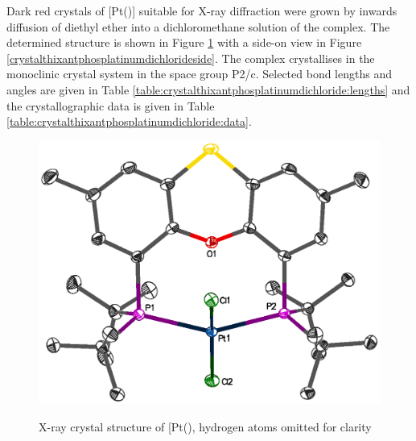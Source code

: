 Dark red crystals of [Pt(\tButhixantphos)] suitable for X-ray diffraction were grown by inwards diffusion of diethyl ether into a dichloromethane solution of the complex.  The determined structure is shown in Figure \ref{crystalthixantphosplatinumdichloride} with a side-on view in Figure \ref{crystalthixantphosplatinumdichlorideside}.  The complex crystallises in the monoclinic crystal system in the space group P2/c.  Selected bond lengths and angles are given in Table \ref{table:crystalthixantphosplatinumdichloride:lengths} and the crystallographic data is given in Table \ref{table:crystalthixantphosplatinumdichloride:data}.  

\begin{figure}[htbp]
\begin{center}
\vspace{0.5cm}
\includegraphics[scale=0.8]{../Figures/Crystalthixantphosplatinumdichloride.eps}
\caption[X-ray crystal structure of \ce{[Pt(\tButhixantphos)Cl2]}]{X-ray crystal structure of [Pt(\tButhixantphos)\ce{Cl2]}, hydrogen atoms omitted for clarity}
\vspace{0.2cm}
\label{crystalthixantphosplatinumdichloride}
\end{center}
\end{figure}
\vspace{0.2cm}

